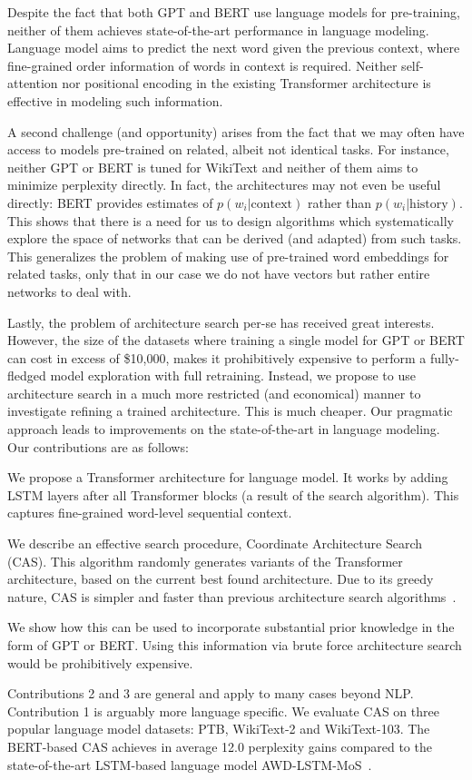 \documentclass[11pt,a4paper]{article}
\begin{document}
Despite the fact that both GPT and BERT use language models for pre-training, neither of them achieves state-of-the-art performance in language modeling. Language model aims to predict the next word given the previous context, where fine-grained order information of words in context is required. Neither self-attention nor positional encoding in the existing Transformer architecture is effective in modeling such information. 

A second challenge (and opportunity) arises from the fact that we may often have access to models pre-trained on related, albeit not identical tasks. For instance, neither GPT or BERT is tuned for WikiText and neither of them aims to minimize perplexity directly. In fact, the architectures may not even be useful directly: BERT provides estimates of $p(w_i|\mathrm{context})$ rather than $p(w_i|\mathrm{history})$. This shows that there is a need for us to design algorithms which systematically explore the space of networks that can be derived (and adapted) from such tasks. This generalizes the problem of making use of pre-trained word embeddings for related tasks, only that in our case we do not have vectors but rather entire networks to deal with. 

Lastly, the problem of architecture search per-se has received great interests. However, the size of the datasets where training a single model for GPT or BERT can cost in excess of \$10,000, makes it prohibitively expensive to perform a fully-fledged model exploration with full retraining. Instead, we propose to use architecture search in a much more restricted (and economical) manner to investigate refining a trained architecture. This is much cheaper. Our pragmatic approach leads to improvements on the state-of-the-art in language modeling. 
Our contributions are as follows:
\begin{enumerate*}
    \item We propose a Transformer architecture for language model. It works by adding LSTM layers after all Transformer blocks (a result of the search algorithm). This captures fine-grained word-level sequential context.
    \item We describe an effective search procedure, Coordinate Architecture Search (CAS). This algorithm randomly generates variants of the Transformer architecture, based on the current best found architecture. Due to its greedy nature, CAS is simpler and faster than previous architecture search algorithms~\cite{ZophL16,PhamGZLD18,Liu09055}.
    \item We show how this can be used to incorporate substantial prior knowledge in the form of GPT or BERT. Using this information via brute force architecture search would be prohibitively expensive.
\end{enumerate*}
Contributions 2 and 3 are general and apply to many cases beyond NLP. Contribution 1 is arguably more language specific. We evaluate CAS on three popular language model datasets: PTB, WikiText-2 and WikiText-103. The BERT-based CAS achieves in average 12.0 perplexity gains compared to the state-of-the-art LSTM-based language model AWD-LSTM-MoS~\cite{Yang03953}.
\end{document}
